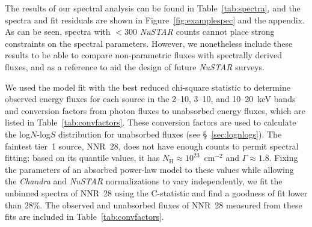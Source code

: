 \documentclass[iop,revtex4]{emulateapj}
\begin{document}
The results of our spectral analysis can be found in Table~\ref{tab:spectra}, and the spectra and fit residuals are shown in Figure~\ref{fig:examplespec} and the appendix.  As can be seen, spectra with $<300$ \textit{NuSTAR} counts cannot place strong constraints on the spectral parameters.  However, we nonetheless include these results to be able to compare non-parametric fluxes with spectrally derived fluxes, and as a reference to aid the design of future \textit{NuSTAR} surveys.  \par
We used the model fit with the best reduced chi-square statistic to determine observed energy fluxes for each source in the 2--10, 3--10, and 10--20~keV bands and conversion factors from photon fluxes to unabsorbed energy fluxes, which are listed in Table~\ref{tab:convfactors}.  These conversion factors are used to calculate the log$N$-log$S$ distribution for unabsorbed fluxes (see \S~\ref{sec:lognlogs}).  The faintest tier~1 source, NNR~28, does not have enough counts to permit spectral fitting; based on its quantile values, it has $N_{\mathrm{H}}\approx10^{23}$~cm$^{-2}$ and $\Gamma\approx1.8$.  Fixing the parameters of an absorbed power-law model to these values while allowing the \textit{Chandra} and \textit{NuSTAR} normalizations to vary independently, we fit the unbinned spectra of NNR~28 using the C-statistic \citep{cash79} and find a goodness of fit lower than 28\%.  The observed and unabsorbed fluxes of NNR~28 measured from these fits are included in Table~\ref{tab:convfactors}.  \par
\end{document}
